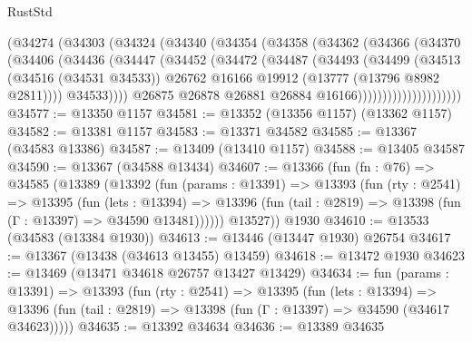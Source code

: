 \begin{lexlean}{RustStd}
\begin{coremodule}
                      (@34274
                        (@34303
                          (@34324
                            (@34340
                              (@34354
                                (@34358
                                  (@34362
                                    (@34366
                                      (@34370
                                        (@34406
                                          (@34436
                                            (@34447
                                              (@34452
                                                (@34472
                                                  (@34487
                                                    (@34493
                                                      (@34499
                                                        (@34513
                                                          (@34516 (@34531 @34533))
                                                          @26762
                                                          @16166
                                                          @19912
                                                          (@13777 (@13796 @8982 @2811))))
                                                      @34533))))
                                              @26875
                                              @26878
                                              @26881
                                              @26884
                                              @16166)))))))))))))))))))))
@34577 := @13350 @1157
@34581 := @13352 (@13356 @1157) (@13362 @1157)
@34582 := @13381 @1157
@34583 := @13371 @34582
@34585 := @13367 (@34583 @13386)
@34587 := @13409 (@13410 @1157)
@34588 := @13405 @34587
@34590 := @13367 (@34588 @13434)
@34607 := @13366
    (fun (fn : @76) =>
    @34585
      (@13389
        (@13392
          (fun (params : @13391) =>
          @13393
            (fun (rty : @2541) =>
            @13395
              (fun (lets : @13394) =>
              @13396 (fun (tail : @2819) => @13398 (fun (Γ : @13397) => @34590 @13481))))))
        @13527))
    @1930
@34610 := @13533 (@34583 (@13384 @1930))
@34613 := @13446 (@13447 @1930) @26754
@34617 := @13367 (@13438 (@34613 @13455) @13459)
@34618 := @13472 @1930
@34623 := @13469 (@13471 @34618 @26757 @13427 @13429)
@34634 := fun (params : @13391) =>
  @13393
    (fun (rty : @2541) =>
    @13395
      (fun (lets : @13394) =>
      @13396 (fun (tail : @2819) => @13398 (fun (Γ : @13397) => @34590 (@34617 @34623)))))
@34635 := @13392 @34634
@34636 := @13389 @34635

\end{coremodule}
\end{lexlean}

